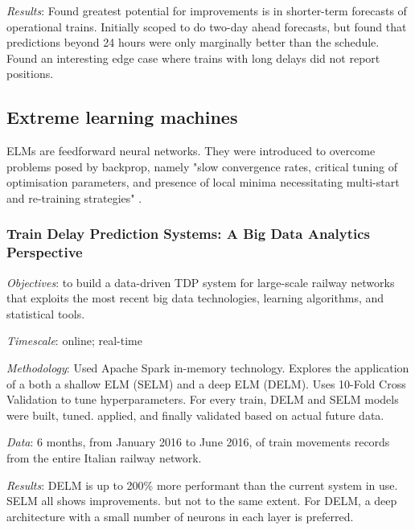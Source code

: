 \documentclass{article}
\begin{document}
\smallskip

\textit{Results}: Found greatest potential for improvements is in shorter-term forecasts of operational trains. Initially scoped to do two-day ahead forecasts, but found that predictions beyond 24 hours were only marginally better than the schedule. Found an interesting edge case where trains with long delays did not report positions. 

\subsection{Extreme learning machines}

ELMs are feedforward neural networks. They were introduced to overcome problems posed by backprop, namely "slow convergence rates, critical tuning of optimisation parameters, and presence of local minima necessitating multi-start and re-training strategies" \cite{oneto_et_al_2017a}.

\subsubsection{Train Delay Prediction Systems: A Big Data Analytics Perspective \cite{oneto_et_al_2017a}}

\textit{Objectives}: to build a data-driven TDP system for large-scale railway networks that exploits the most recent big data technologies, learning algorithms, and statistical tools. 

\smallskip

\textit{Timescale}: online; real-time

\smallskip

\textit{Methodology}: Used Apache Spark in-memory technology. Explores the application of a both a shallow ELM (SELM) and a deep ELM (DELM). Uses 10-Fold Cross Validation to tune hyperparameters. For every train, DELM and SELM models were built, tuned. applied, and finally validated based on actual future data. 

\smallskip

\textit{Data}: 6 months, from January 2016 to June 2016, of train movements records from the entire Italian railway network.

\smallskip

\textit{Results}: DELM is up to 200\% more performant than the current system in use. SELM all shows improvements. but not to the same extent. For DELM, a deep architecture with a small number of neurons in each layer is preferred.
\end{document}
